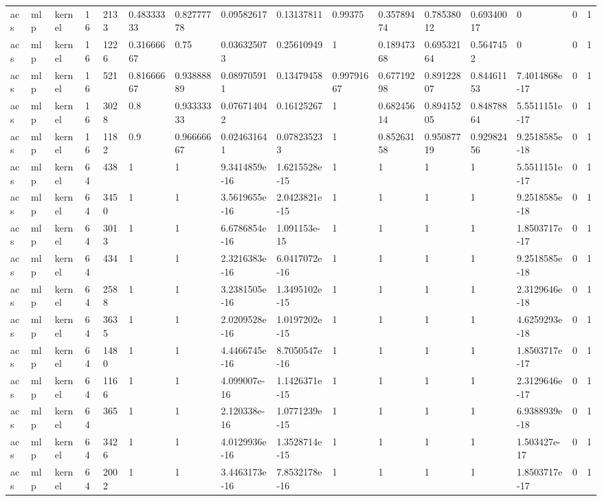 \begin{tabular}{llllllllllllllll}
acs & mlp & kernel & 16 & 2133 & 0.48333333 & 0.82777778 & 0.09582617 & 0.13137811 & 0.99375 & 0.35789474 & 0.78538012 & 0.69340017 & 0 & 0 & 1 \\
acs & mlp & kernel & 16 & 1226 & 0.31666667 & 0.75 & 0.036325073 & 0.25610949 & 1 & 0.18947368 & 0.69532164 & 0.5647452 & 0 & 0 & 1 \\
acs & mlp & kernel & 16 & 521 & 0.81666667 & 0.93888889 & 0.089705911 & 0.13479458 & 0.99791667 & 0.67719298 & 0.89122807 & 0.84461153 & 7.4014868e-17 & 0 & 1 \\
acs & mlp & kernel & 16 & 3028 & 0.8 & 0.93333333 & 0.076714042 & 0.16125267 & 1 & 0.68245614 & 0.89415205 & 0.84878864 & 5.5511151e-17 & 0 & 1 \\
acs & mlp & kernel & 16 & 1182 & 0.9 & 0.96666667 & 0.024631641 & 0.078235233 & 1 & 0.85263158 & 0.95087719 & 0.92982456 & 9.2518585e-18 & 0 & 1 \\
acs & mlp & kernel & 64 & 438 & 1 & 1 & 9.3414859e-16 & 1.6215528e-15 & 1 & 1 & 1 & 1 & 5.5511151e-17 & 0 & 1 \\
acs & mlp & kernel & 64 & 3450 & 1 & 1 & 3.5619655e-16 & 2.0423821e-15 & 1 & 1 & 1 & 1 & 9.2518585e-18 & 0 & 1 \\
acs & mlp & kernel & 64 & 3013 & 1 & 1 & 6.6786854e-16 & 1.091153e-15 & 1 & 1 & 1 & 1 & 1.8503717e-17 & 0 & 1 \\
acs & mlp & kernel & 64 & 434 & 1 & 1 & 2.3216383e-16 & 6.0417072e-16 & 1 & 1 & 1 & 1 & 9.2518585e-18 & 0 & 1 \\
acs & mlp & kernel & 64 & 2588 & 1 & 1 & 3.2381505e-16 & 1.3495102e-15 & 1 & 1 & 1 & 1 & 2.3129646e-18 & 0 & 1 \\
acs & mlp & kernel & 64 & 3635 & 1 & 1 & 2.0209528e-16 & 1.0197202e-15 & 1 & 1 & 1 & 1 & 4.6259293e-18 & 0 & 1 \\
acs & mlp & kernel & 64 & 1480 & 1 & 1 & 4.4466745e-16 & 8.7050547e-16 & 1 & 1 & 1 & 1 & 1.8503717e-17 & 0 & 1 \\
acs & mlp & kernel & 64 & 1166 & 1 & 1 & 4.099007e-16 & 1.1426371e-15 & 1 & 1 & 1 & 1 & 2.3129646e-17 & 0 & 1 \\
acs & mlp & kernel & 64 & 365 & 1 & 1 & 2.120338e-16 & 1.0771239e-15 & 1 & 1 & 1 & 1 & 6.9388939e-18 & 0 & 1 \\
acs & mlp & kernel & 64 & 3426 & 1 & 1 & 4.0129936e-16 & 1.3528714e-15 & 1 & 1 & 1 & 1 & 1.503427e-17 & 0 & 1 \\
acs & mlp & kernel & 64 & 2002 & 1 & 1 & 3.4463173e-16 & 7.8532178e-16 & 1 & 1 & 1 & 1 & 1.8503717e-17 & 0 & 1 \\

\end{tabular}

